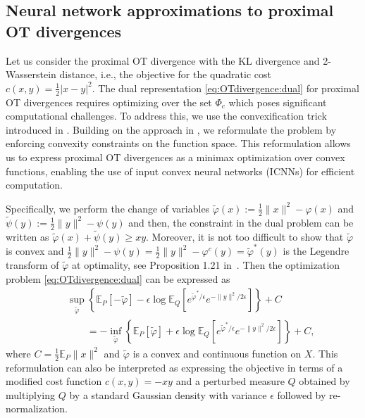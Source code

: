 \documentclass{amsart}
\theoremstyle{definition}
\theoremstyle{remark}
\numberwithin{equation}{section}
\begin{document}
\subsection{Neural network approximations to proximal OT divergences}\label{sec:algorithms.CNN}
Let us consider the proximal OT divergence with the KL divergence and 2-Wasserstein distance, i.e., the  objective for the quadratic cost $c(x,y) = \frac{1}{2}|x-y|^2$. The dual representation \eqref{eq:OTdivergence:dual} for proximal OT divergences requires optimizing over the set $\Phi_c$ which poses significant computational challenges. To address this, we use the convexification trick introduced in \cite{Villani2003topics}. Building on the approach in \cite{makkuva2020optimal},  we reformulate the problem by enforcing convexity constraints on the function space. This reformulation allows us to express proximal OT divergences as a minimax optimization over convex functions, enabling the use of input convex neural networks (ICNNs) for efficient computation.

Specifically, we perform the change of variables $\widetilde\varphi(x) := \frac{1}{2}\|x\|^2 - \varphi(x)$ and $\widetilde\psi(y) := \frac{1}{2}\|y\|^2 - \psi(y)$ and then, the constraint in the dual problem can be written as $\widetilde\varphi(x) + \widetilde\psi(y) \geq xy$. Moreover, it is not too difficult to show that $\widetilde\varphi$ is convex and $\frac{1}{2}\|y\|^2 - \psi(y) = \frac{1}{2}\|y\|^2 - \varphi^c(y) = \widetilde\varphi^*(y)$ is the Legendre transform of $\widetilde\varphi$ at optimality, see Proposition 1.21 in~\cite{Santambrogio}. Then the optimization problem \eqref{eq:OTdivergence:dual} can be expressed as
\begin{eqnarray} \label{eq:variational_OTDiv}
&&\sup_{\widetilde\varphi} \left\{\mathbb{E}_P[-\widetilde\varphi] - \epsilon \log \mathbb{E}_Q[e^{\widetilde\varphi^*/\epsilon}e^{-\|y\|^2/2\epsilon}] \right\} + C \nonumber\\
&&\qquad= -\inf_{\widetilde\varphi} \left\{\mathbb{E}_P[\widetilde\varphi] + \epsilon \log \mathbb{E}_Q[e^{\widetilde\varphi^*/\epsilon}e^{-\|y\|^2/2\epsilon}] \right\} + C,
\end{eqnarray}
where $C = \frac{1}{2}\mathbb{E}_P\|x\|^2$ and $\widetilde\varphi$ is a convex and continuous function on $X$. This reformulation can also be interpreted as expressing the objective in terms of a modified cost function $c(x,y) = -xy$ and a perturbed measure $Q$ obtained by multiplying $Q$ by a standard Gaussian density with variance $\epsilon$ followed by re-normalization.
\end{document}
